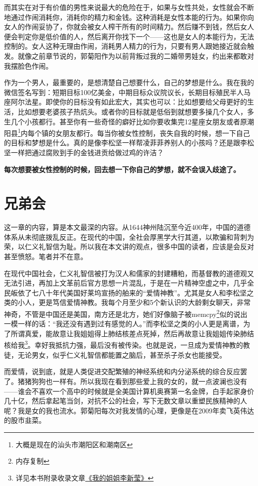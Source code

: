 而其实在对于有价值的男性来说最大的危险在于，如果与女性共处，女性就会不断地通过作闹消耗你，消耗你的精力和金钱。这种消耗是女性本能的行为。如果你向女人的作闹妥协了，你就会被女人榨干所有的时间精力。然后赚不到钱，然后女人便会判定你是低价值的人，然后离开你找下一个——这也是女人的本能行为，无法控制的。女人这种无理由作闹，消耗男人精力的行为，只要有男人跟她接近就会触发。就像之前章节说的，郭菊阳作为以前背叛过我的二婚带男娃女，约出来都敢对我摆脸色作闹。

作为一个男人，最重要的，是想清楚自己想要什么，自己的梦想是什么。我在我的微信签名写到：短期目标100亿美金，中期目标众议院议长，长期目标殖民半人马座阿尔法星。即使你的目标没有如此宏大，其实也可以：比如想要给父母更好的生活，比如想要老婆孩子热炕头。或者你的目标就是低俗到就想要多操几个女人，多生几个小孩都行。甚至你有一些奇怪的癖好比如你要收集完12星座女朋友或者原潮阳县\footnote{大概是现在的汕头市潮阳区和潮南区}内每个镇的女朋友都行。每当你被女性控制，丧失自我的时候，想一下自己的目标和梦想是什么。真的是像李松坚一样帮凌菲菲养别人的小孩吗？还是跟李松坚一样把通过腐败到手的金钱进贡给做过鸡的许洁？

\textbf{每次想要被女性控制的时候，回去想一下你自己的梦想，就不会误入歧途了。}

\section{兄弟会}

这一章的内容，算是本文最深的内容。从1644神州陆沉至今近400年，中国的道德体系从未彻底拨乱反正。在现代的中国，全社会厚黑学大行其道，以欺骗和背刺为荣，以仁义礼智信为耻。所以我在本文讲的观点，很多中国的读者，应该是会反对甚至愤怒。笔者并不在意。

在现代中国社会，仁义礼智信被打为汉人和儒家的封建糟粕，而基督教的道德观又无法引进，再加上文革前后官方思想一片混乱，于是在一片精神空虚之中，几乎全民皈依了七八十年代美国好莱坞宣扬的舶来的``爱情神教''。尤其是女人和李松坚之类的小人，更是笃信爱情神教。我每个月至少和5个新认识的大龄剩女聊天，非常神奇，不管是中国还是美国，南方还是北方，她们好像脑子被memcpy\footnote{内存复制}似的说出一模一样的话：``我还没有遇到过有感觉的人。''而李松坚之类的小人更是离谱，为了所谓真爱，能故意让我姐姐得上肺结核差点死掉，然后再故意让我姐姐传染肺结核给我\footnote{详见本书附录收录文章\hyperref[sister]{《我的姐姐李新莹》}}。幸好我抵抗力强，最后没有被传染。也就是说，一旦成为爱情神教的教徒，无论男女，似乎仁义礼智信都能置之脑后，甚至杀子杀女也能接受。

而爱情，说到底，就是人类促进交配繁殖的神经系统和内分泌系统的综合反应罢了。猪猪狗狗也一样有。所以我现在看到那些爱上我的女的，就一点波澜也没有——谁会不喜欢一个高中的时候就是全美国计算机奥赛第一名金牌，白手起家身价几十亿，然后拿起笔当剑，对抗不公的社会，写下无数文章以重塑民族精神的人呢？我是女的我也流水。郭菊阳每次对我发情的心理，更像是在2009年卖飞英伟达的股市韭菜。

